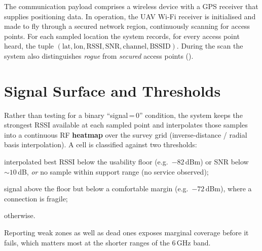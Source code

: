The communication payload comprises a wireless device with a GPS receiver that
supplies positioning data. In operation, the UAV Wi-Fi receiver is initialised
and made to fly through a secured network region, continuously scanning for
access points. For each sampled location the system records, for every access
point heard, the tuple
$(\text{lat},\text{lon},\text{RSSI},\text{SNR},\text{channel},\text{BSSID})$.
During the scan the system also distinguishes \emph{rogue} from \emph{secured}
access points ().

\section{Signal Surface and Thresholds}
Rather than testing for a binary ``signal\,=\,0'' condition, the system keeps the
strongest RSSI available at each sampled point and interpolates those samples into
a continuous RF \textbf{heatmap} over the survey grid (inverse-distance / radial
basis interpolation). A cell is classified against two thresholds:
\begin{description}[leftmargin=1.6em,style=nextline]
  \item[Dead] interpolated best RSSI below the usability floor
    (e.g.\ $-82$\,dBm) or SNR below $\sim 10$\,dB, \emph{or} no sample within
    support range (no service observed);
  \item[Weak] signal above the floor but below a comfortable margin
    (e.g.\ $-72$\,dBm), where a connection is fragile;
  \item[OK] otherwise.
\end{description}
Reporting weak zones as well as dead ones exposes marginal coverage before it
fails, which matters most at the shorter ranges of the 6\,GHz band.


